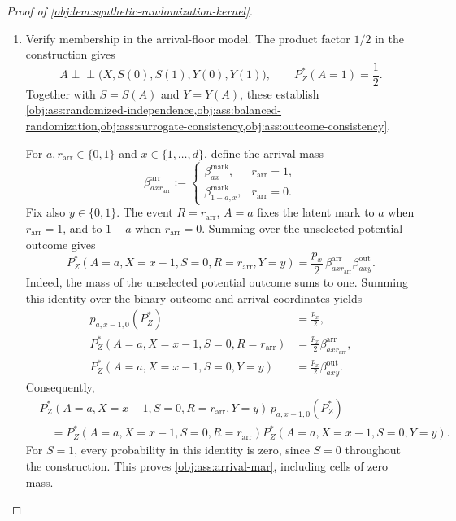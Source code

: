 \begin{proof}[Proof of \cref{obj:lem:synthetic-randomization-kernel}]
\begin{enumerate}
On this probability space set
\[
S(0):=S(1):=0,\qquad
S:=S(A),\qquad
Y:=Y(A),\qquad
R:=\mathbf 1\{B^{\mathrm{lat}}=A\},
\]
and define the full-data law
\[
P_Z^*
:=
\mathcal L_{\mathbb P_{\mathrm{lat}}}
\bigl(X,A,S(0),S(1),Y(0),Y(1),S,Y,R\bigr).
\]
Here \(\mathcal L\) denotes the distribution of the displayed coordinates.

\item Verify membership in the arrival-floor model. The product factor \(1/2\) in the construction gives
\[
A\perp\!\!\!\perp
\bigl(X,S(0),S(1),Y(0),Y(1)\bigr),
\qquad
P_Z^*(A=1)=\frac12.
\]
Together with \(S=S(A)\) and \(Y=Y(A)\), these establish
\cref{obj:ass:randomized-independence,obj:ass:balanced-randomization,obj:ass:surrogate-consistency,obj:ass:outcome-consistency}.

For \(a,r_{\mathrm{arr}}\in\{0,1\}\) and \(x\in\{1,\ldots,d\}\), define the arrival mass
\[
\beta^{\mathrm{arr}}_{axr_{\mathrm{arr}}}
:=
\begin{cases}
\beta^{\mathrm{mark}}_{ax},&r_{\mathrm{arr}}=1,\\
\beta^{\mathrm{mark}}_{1-a,x},&r_{\mathrm{arr}}=0.
\end{cases}
\]
Fix also \(y\in\{0,1\}\). The event \(R=r_{\mathrm{arr}}\), \(A=a\) fixes the latent mark to \(a\) when \(r_{\mathrm{arr}}=1\), and to \(1-a\) when \(r_{\mathrm{arr}}=0\). Summing over the unselected potential outcome gives
\begin{equation}\label{eq:synthetic-randomization-joint-mass}
P_Z^*(A=a,X=x-1,S=0,R=r_{\mathrm{arr}},Y=y)
=
\frac{p_x}{2}\,
\beta^{\mathrm{arr}}_{axr_{\mathrm{arr}}}
\beta^{\mathrm{out}}_{axy}.
\end{equation}
Indeed, the mass of the unselected potential outcome sums to one. Summing this identity over the binary outcome and arrival coordinates yields
\[
\begin{aligned}
p_{a,x-1,0}(P_Z^*)&=\frac{p_x}{2},\\
P_Z^*(A=a,X=x-1,S=0,R=r_{\mathrm{arr}})
&=\frac{p_x}{2}\beta^{\mathrm{arr}}_{axr_{\mathrm{arr}}},\\
P_Z^*(A=a,X=x-1,S=0,Y=y)
&=\frac{p_x}{2}\beta^{\mathrm{out}}_{axy}.
\end{aligned}
\]
Consequently,
\[
\begin{aligned}
&P_Z^*(A=a,X=x-1,S=0,R=r_{\mathrm{arr}},Y=y)\,
p_{a,x-1,0}(P_Z^*)\\
&\quad=
P_Z^*(A=a,X=x-1,S=0,R=r_{\mathrm{arr}})
P_Z^*(A=a,X=x-1,S=0,Y=y).
\end{aligned}
\]
For \(S=1\), every probability in this identity is zero, since \(S=0\) throughout the construction. This proves \cref{obj:ass:arrival-mar}, including cells of zero mass.


\end{enumerate}
\end{proof}
